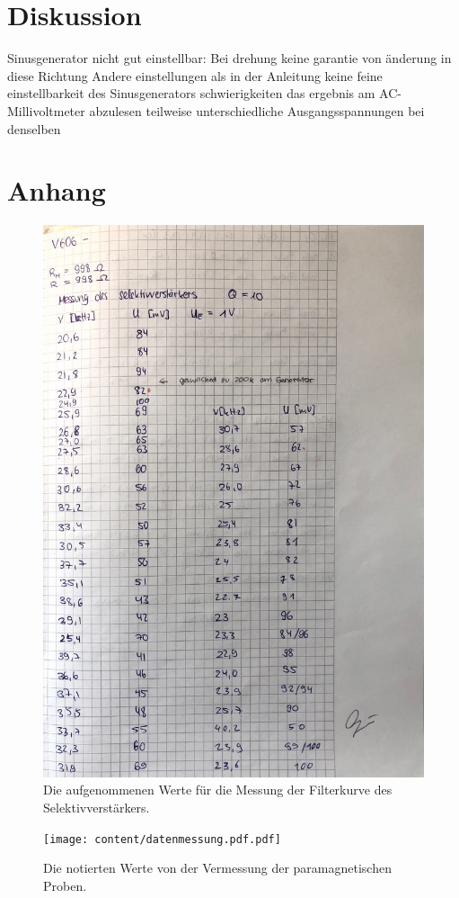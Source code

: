 \section{Diskussion}
\label{sec:Diskussion}
Sinusgenerator nicht gut einstellbar: Bei drehung keine garantie von änderung in diese Richtung
Andere einstellungen als in der Anleitung
keine feine einstellbarkeit des Sinusgenerators
schwierigkeiten das ergebnis am AC-Millivoltmeter abzulesen
teilweise unterschiedliche Ausgangsspannungen bei denselben 
\section{Anhang}
\label{sec:Anhang}
\begin{figure}
    \centering
    \includegraphics[width=\textwidth]{content/datenselektiv.pdf}
    \caption{Die aufgenommenen Werte für die Messung der Filterkurve des Selektivverstärkers.}
    \label{fig:datenselektiv}
\end{figure}
\begin{figure}
    \centering
    \texttt{[image: content/datenmessung.pdf.pdf]}
    \caption{Die notierten Werte von der Vermessung der paramagnetischen Proben.}
    \label{fig:datenmessung}
\end{figure}